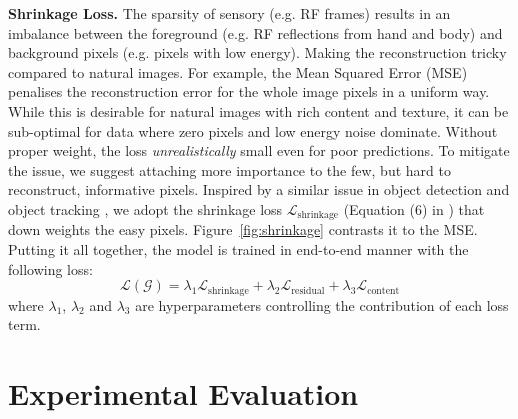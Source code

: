 \documentclass[10pt, conference, compsocconf]{IEEEtran}
\begin{document}
\textbf{Shrinkage Loss.} The sparsity of sensory (e.g. RF frames) results in an imbalance between the foreground (e.g. RF reflections from hand and body) and background pixels (e.g. pixels with low energy). 
Making the reconstruction tricky compared to natural images. For example, the  Mean Squared Error (MSE) 
 penalises the reconstruction error for the whole image pixels in a uniform way.
 While this is desirable for natural images with rich content and texture, it can be 
 sub-optimal for data where zero pixels and low energy noise dominate. 
 Without proper weight, the loss {\em unrealistically} small even for poor predictions. To mitigate the issue, we suggest attaching more importance to the few, but hard to reconstruct, informative pixels. Inspired by a similar issue in object detection \cite{lin2017focal} and object tracking \cite{lu2020deep}, we adopt the shrinkage loss $\mathcal{L}_{\text{shrinkage}}$ (Equation (6) in \cite{lu2020deep}) that down weights the easy pixels. Figure~\ref{fig:shrinkage} contrasts it to the MSE. Putting it all together,  the model is trained in end-to-end manner with the following loss:
\begin{equation}
    \mathcal{L}(\mathcal{G}) = \lambda_{1} \mathcal{L}_{\text{shrinkage}} +\lambda_{2} \mathcal{L}_{\text{residual}} +\lambda_{3} \mathcal{L}_{\text{content}}
\end{equation}
where $\lambda_{1}$, $\lambda_{2}$  and $\lambda_{3}$ are hyperparameters controlling the contribution of each loss term.



\section{Experimental Evaluation}
\end{document}

